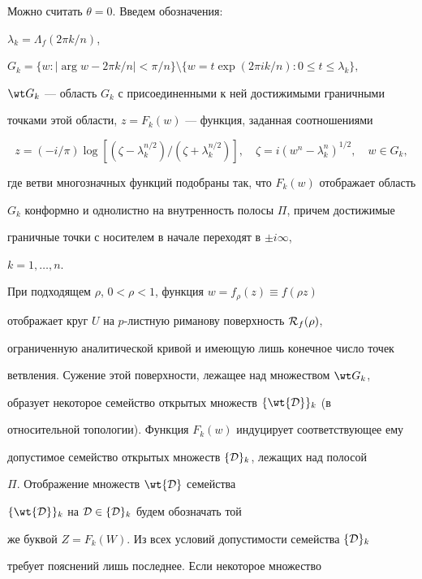 \begin{pf}


Можно считать $\theta=0$. Введем обозначения:


$\lambda_k=\Lambda_f(2\pi k/n)$,


$G_k=\{w:\mid\arg w-2\pi k/n|<\pi/n\}\setminus \{w=t\exp (2\pi ik/n):0\leq


t\leq \lambda_k\},$


$\wt G_k$ --- область $G_k$ с присоединенными к ней достижимыми граничными


точками этой области, $z=F_k(w)$ --- функция, заданная соотношениями


$$


z=(-i/\pi)\log [(\zeta-\lambda_k^{n/2})/(\zeta+\lambda_k^{n/2})],\quad


\zeta=i(w^n-\lambda_k^n)^{1/2},\quad w\in G_k,


$$


где ветви многозначных функций подобраны так, что $F_k(w)$ отображает область


$G_k$ конформно и однолистно на внутренность полосы $\Pi$, причем достижимые


граничные точки с носителем в начале переходят в $\pm i\infty$,


$k=1,\dotsc, n$.





При подходящем $\rho$, $0< \rho<1$, функция $w=f_{\rho}(z)\equiv f(\rho z)$


отображает круг $U$ на $p$-листную риманову поверхность ${\cal R}_f(\rho)$,


ограниченную аналитической кривой и имеющую лишь конечное число точек


ветвления. Сужение этой поверхности, лежащее над множеством $\wt G_k$,


образует некоторое семейство открытых множеств $\{\wt {\cal D}\}_k$ (в


относительной топологии). Функция $F_k(w)$ индуцирует соответствующее ему


допустимое семейство открытых множеств $\{{\cal D}\}_k$, лежащих над полосой


$\Pi$. Отображение множеств $\wt {\cal D}$ семейства


$\{\wt {\cal D}\}_k$ на ${\cal D}\in \{{\cal D}\}_k$ будем обозначать той


же буквой $Z=F_k(W)$. Из всех условий допустимости семейства $\{{\cal D}\}_k$


требует пояснений лишь последнее. Если некоторое множество



\end{pf}
